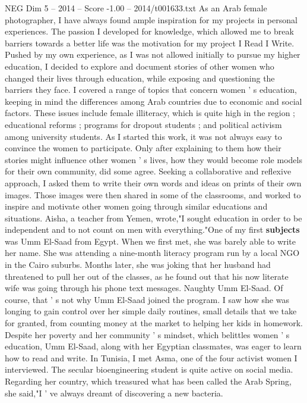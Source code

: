 \begin{textsample}{NEG Dim 5 – 2014 – Score -1.00 – 2014/t001633.txt}  \label{ex:f5_neg_038}
As an Arab female photographer, I have always found ample inspiration for my projects in personal experiences.
The passion I developed for knowledge, which allowed me to break barriers towards a better life was the motivation for my project I Read I Write.
Pushed by my own experience, as I was not allowed initially to pursue my higher education, I decided to explore and document stories of other women who changed their lives through education, while exposing and questioning the barriers they face.
I covered a range of topics that concern women ' s education, keeping in mind the differences among Arab countries due to economic and social factors.
These issues include female illiteracy, which is quite high in the region ; educational reforms ; programs for dropout students ; and political activism among university students.
As I started this work, it was not always easy to convince the women to participate.
Only after explaining to them how their stories might influence other women ' s lives, how they would become role models for their own community, did some agree.
Seeking a collaborative and reflexive approach, I asked them to write their own words and ideas on prints of their own images.
Those images were then shared in some of the classrooms, and worked to inspire and motivate other women going through similar educations and situations.
Aisha, a teacher from Yemen, wrote,"I sought education in order to be independent and to not count on men with everything."One of my first \textbf{subjects} was Umm El-Saad from Egypt.
When we first met, she was barely able to write her name.
She was attending a nine-month literacy program run by a local NGO in the Cairo suburbs.
Months later, she was joking that her husband had threatened to pull her out of the classes, as he found out that his now literate wife was going through his phone text messages.
Naughty Umm El-Saad.
Of course, that ' s not why Umm El-Saad joined the program.
I saw how she was longing to gain control over her simple daily routines, small details that we take for granted, from counting money at the market to helping her kids in homework.
Despite her poverty and her community ' s mindset, which belittles women ' s education, Umm El-Saad, along with her Egyptian classmates, was eager to learn how to read and write.
In Tunisia, I met Asma, one of the four activist women I interviewed.
The secular bioengineering student is quite active on social media.
Regarding her country, which treasured what has been called the Arab Spring, she said,"I ' ve always dreamt of discovering a new bacteria.

\end{textsample}
